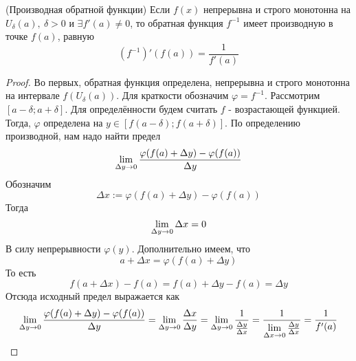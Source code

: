 \begin{theorem} (Производная обратной функции)
	Если $f(x)$ непрерывна и строго монотонна на $U_{\delta}(a),\ \delta > 0$ и $\exists f'(a) \neq 0$, то обратная функция $f^{-1}$ имеет производную в точке $f(a)$, равную
	$$
		(f^{-1})'(f(a)) = \frac{1}{f'(a)}
	$$
\end{theorem}

\begin{proof}
	Во первых, обратная функция определена, непрерывна и строго монотонна на интервале $f(U_{\delta}(a))$. Для краткости обозначим $\varphi = f^{-1}$. Рассмотрим $[a - \delta; a + \delta]$. Для определённости будем считать $f$ - возрастающей функцией. Тогда, $\varphi$ определена на $y \in [f(a - \delta); f(a + \delta)]$. По определению производной, нам надо найти предел
	\[
		\lim\limits_{\Delta y \to 0} \frac{\varphi(f(a) + \Delta y) - \varphi(f(a))}{\Delta y}
	\]
	Обозначим
	\[
		\Delta x := \varphi(f(a) + \Delta y) - \varphi(f(a))
	\]
	Тогда
	\[
		\lim\limits_{\Delta y \to 0} \Delta x = 0
	\]
	В силу непрерывности $\varphi(y)$. Дополнительно имеем, что
	\[
		a + \Delta x = \varphi(f(a) + \Delta y)
	\]
	То есть
	\[
		f(a + \Delta x) - f(a) = f(a) + \Delta y - f(a) = \Delta y
	\]
	Отсюда исходный предел выражается как
	\[
		\lim\limits_{\Delta y \to 0} \frac{\varphi(f(a) + \Delta y) - \varphi(f(a))}{\Delta y} = \lim\limits_{\Delta y \to 0} \frac{\Delta x}{\Delta y} = \lim\limits_{\Delta y \to 0} \frac{1}{\frac{\Delta y}{\Delta x}} = \frac{1}{\lim\limits_{\Delta x \to 0} \frac{\Delta y}{\Delta x}} = \frac{1}{f'(a)}
	\]
\end{proof}
